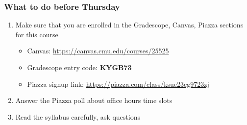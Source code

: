 \documentclass[10pt]{beamer}
\begin{document}

\begin{frame}

\frametitle{What to do before Thursday}

\begin{enumerate}
  \item Make sure that you are enrolled in the Gradescope, Canvas, Piazza sections for this course
  \begin{itemize}
    \item Canvas: \url{https://canvas.cmu.edu/courses/25525}
    \item Gradescope entry code: \textbf{KYGB73}
    \item Piazza signup link: \url{https://piazza.com/class/ksue23cg9723zj}
  \end{itemize}
  \item Answer the Piazza poll about office hours time slots
  \item Read the syllabus carefully, ask questions
\end{enumerate}

\end{frame}
\end{document}
